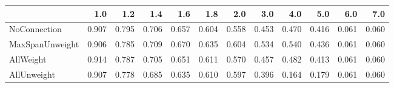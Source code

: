 \begin{tabular}{lrrrrrrrrrrr}
\toprule
{} &   1.0 &   1.2 &   1.4 &   1.6 &   1.8 &   2.0 &   3.0 &   4.0 &   5.0 &   6.0 &   7.0 \\
\midrule
NoConnection    & 0.907 & 0.795 & 0.706 & 0.657 & 0.604 & 0.558 & 0.453 & 0.470 & 0.416 & 0.061 & 0.060 \\
MaxSpanUnweight & 0.906 & 0.785 & 0.709 & 0.670 & 0.635 & 0.604 & 0.534 & 0.540 & 0.436 & 0.061 & 0.060 \\
AllWeight       & 0.914 & 0.787 & 0.705 & 0.651 & 0.611 & 0.570 & 0.457 & 0.482 & 0.413 & 0.061 & 0.060 \\
AllUnweight     & 0.907 & 0.778 & 0.685 & 0.635 & 0.610 & 0.597 & 0.396 & 0.164 & 0.179 & 0.061 & 0.060 \\
\bottomrule
\end{tabular}
